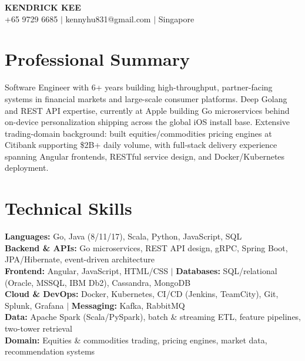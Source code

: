 \documentclass[10pt,a4paper]{article}
\begin{document}
\begin{center}
    {\sffamily\LARGE\bfseries KENDRICK KEE} \\
    \vspace{3pt}
    {\small +65 9729 6685 $|$ kennyhu831@gmail.com $|$ Singapore}
\end{center}
\vspace{-8pt}

\section{Professional Summary}
Software Engineer with 6+ years building high-throughput, partner-facing systems in financial markets and large-scale consumer platforms. Deep Golang and REST API expertise, currently at Apple building Go microservices behind on-device personalization shipping across the global iOS install base. Extensive trading-domain background: built equities/commodities pricing engines at Citibank supporting \$2B+ daily volume, with full-stack delivery experience spanning Angular frontends, RESTful service design, and Docker/Kubernetes deployment.

\section{Technical Skills}
\vspace{-2pt}
\textbf{Languages:} Go, Java (8/11/17), Scala, Python, JavaScript, SQL \\
\textbf{Backend \& APIs:} Go microservices, REST API design, gRPC, Spring Boot, JPA/Hibernate, event-driven architecture \\
\textbf{Frontend:} Angular, JavaScript, HTML/CSS $|$
\textbf{Databases:} SQL/relational (Oracle, MSSQL, IBM Db2), Cassandra, MongoDB \\
\textbf{Cloud \& DevOps:} Docker, Kubernetes, CI/CD (Jenkins, TeamCity), Git, Splunk, Grafana $|$
\textbf{Messaging:} Kafka, RabbitMQ \\
\textbf{Data:} Apache Spark (Scala/PySpark), batch \& streaming ETL, feature pipelines, two-tower retrieval \\
\textbf{Domain:} Equities \& commodities trading, pricing engines, market data, recommendation systems
\vspace{2pt}
\end{document}
